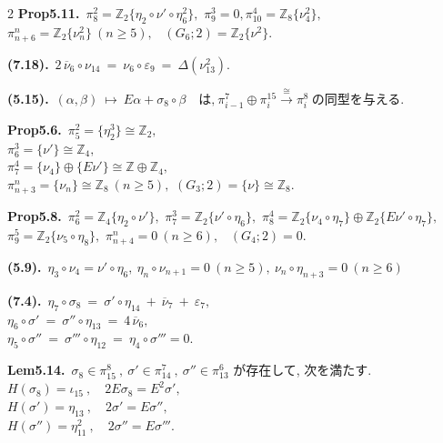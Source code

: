 \documentclass[10pt, leqno]{ltjsarticle}
\newcommand{\ov}[1]{\overline{#1}}
\newcommand{\gen}[1]{\{#1\}}       %
\numberwithin{equation}{section}
\theoremstyle{plain}
\theoremstyle{definition}
\theoremstyle{remark}
\begin{document}
\begin{paracol}{2}
\noindent
\textbf{Prop5.11.}\
\(\pi^{2}_{8}=\mathbb Z_2\gen{\eta_{2}\circ\nu'\circ\eta_6^2},\)\quad 
\(\pi^{3}_{9}=0,\)\quad \(\pi^{4}_{10}=\mathbb Z_8\gen{\nu_{4}^2},\) \\
\(\pi^{n}_{n+6}=\mathbb Z_2\gen{\nu_n^2}\ (n\ge5),\) \
\((G_{6};2)=\mathbb Z_2\gen{\nu^2}.\)

\noindent
\textbf{(7.18).}\
\(2\,\overline{\nu}_{6}\circ \nu_{14}
\ =\ \nu_{6}\circ\varepsilon_{9}
\ =\ \Delta(\nu_{13}^{2}).\)

\noindent
\textbf{(5.15).}\
\((\alpha,\beta)\ \longmapsto\ E\alpha+\sigma_{8}\circ\beta
\quad\text{は,}\
\pi^{7}_{i-1}\oplus\pi^{15}_{i}\xrightarrow{\cong}\pi^{8}_{i}
\ \text{の同型を与える. }\)

\noindent
\textbf{Prop5.6.}\
\(\pi^{2}_{5}=\gen{\eta_{2}^{3}}\cong \mathbb Z_{2},\) \\
\(\pi^{3}_{6}=\gen{\nu'}\cong \mathbb Z_{4},\) \\
\(\pi^{4}_{7}=\gen{\nu_{4}}\oplus \gen{E\nu'}\cong \mathbb Z\oplus\mathbb Z_{4},\) \\
\(\pi^{n}_{n+3}=\gen{\nu_{n}}\cong \mathbb Z_{8}\ (n\ge5),\)\qquad
\((G_{3};2)=\gen{\nu}\cong \mathbb Z_{8}.\)

\noindent
\textbf{Prop5.8.}\
\(\pi^{2}_{6}=\mathbb Z_4\gen{\eta_{2}\circ\nu'},\) \quad
\(\pi^{3}_{7}=\mathbb Z_2\gen{\nu'\circ\eta_6},\) \quad
\(\pi^{4}_{8}=\mathbb Z_2\gen{\nu_{4}\circ\eta_7}\oplus \mathbb Z_2\gen{E\nu'\circ\eta_7},\) \\
\(\pi^{5}_{9}=\mathbb Z_2\gen{\nu_{5}\circ\eta_8},\) \quad
\(\pi^{n}_{n+4}=0\ (n\ge6),\) \
\((G_{4};2)=0.\)

\noindent
\textbf{(5.9).}\
\(\eta_3\circ \nu_4= \nu'\circ \eta_6,\
\eta_n\circ \nu_{n+1}=0\ (n\ge5),\
\nu_n\circ \eta_{n+3}=0\ (n\ge6)\)

\noindent
\textbf{(7.4).}\
\(\eta_{7}\circ\sigma_{8}\ =\ \sigma'\circ\eta_{14}\ +\ \ov{\nu}_{7}\ +\ \varepsilon_{7},\) \\
\(\eta_{6}\circ\sigma'\ =\ \sigma''\circ\eta_{13}\ =\ 4\,\ov{\nu}_{6}, \)\\
\(\eta_5\circ\sigma'' \ =\ \sigma'''\circ\eta_{12}\ =\ \eta_4\circ\sigma''' = 0. \)

\noindent
\textbf{Lem5.14.}\
\(\sigma_{8}\in\pi^{8}_{15}\ , \ \sigma'\in\pi^{7}_{14}\ , \ \sigma''\in\pi^{6}_{13}\) 
が存在して, 次を満たす. \\
\(H(\sigma_{8})=\iota_{15} \ ,\quad 2E\sigma_{8}=E^{2}\sigma',\)\\
\(H(\sigma')=\eta_{13} \ ,\quad 2\sigma'=E\sigma'',\)\\
\(H(\sigma'')=\eta_{11}^2 \ ,\quad 2\sigma''=E\sigma''' .\)


\end{paracol}
\end{document}
